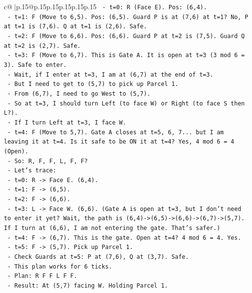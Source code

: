 \documentclass{article}
\begin{document}
{\begin{supertabular}{c@{$\;$}|p{.15\linewidth}@{}p{.15\linewidth}p{.15\linewidth}p{.15\linewidth}p{.15\linewidth}p{.15\linewidth}}
{{{\texttt{    {-} t=0: R (Face E). Pos: (6,4).} \\
\texttt{    {-} t=1: F (Move to 6,5). Pos: (6,5). Guard P is at (7,6) at t=1? No, P at t=1 is (7,6). Q at t=1 is (2,6). Safe.} \\
\texttt{    {-} t=2: F (Move to 6,6). Pos: (6,6). Guard P at t=2 is (7,5). Guard Q at t=2 is (2,7). Safe.} \\
\texttt{    {-} t=3: F (Move to 6,7). This is Gate A. It is open at t=3 (3 mod 6 = 3). Safe to enter.} \\
\texttt{      {-} Wait, if I enter at t=3, I am at (6,7) at the end of t=3.} \\
\texttt{      {-} But I need to get to (5,7) to pick up Parcel 1.} \\
\texttt{      {-} From (6,7), I need to go West to (5,7).} \\
\texttt{      {-} So at t=3, I should turn Left (to face W) or Right (to face S then L?).} \\
\texttt{      {-} If I turn Left at t=3, I face W.} \\
\texttt{      {-} t=4: F (Move to 5,7). Gate A closes at t=5, 6, 7... but I am leaving it at t=4. Is it safe to be ON it at t=4? Yes, 4 mod 6 = 4 (Open).} \\
\texttt{      {-} So: R, F, F, L, F, F?} \\
\texttt{      {-} Let's trace:} \\
\texttt{        {-} t=0: R {-}> Face E. (6,4).} \\
\texttt{        {-} t=1: F {-}> (6,5).} \\
\texttt{        {-} t=2: F {-}> (6,6).} \\
\texttt{        {-} t=3: L {-}> Face W. (6,6). (Gate A is open at t=3, but I don't need to enter it yet? Wait, the path is (6,4){-}>(6,5){-}>(6,6){-}>(6,7){-}>(5,7). If I turn at (6,6), I am not entering the gate. That's safer.)} \\
\texttt{        {-} t=4: F {-}> (6,7). This is the gate. Open at t=4? 4 mod 6 = 4. Yes.} \\
\texttt{        {-} t=5: F {-}> (5,7). Pick up Parcel 1.} \\
\texttt{        {-} Check Guards at t=5: P at (7,6), Q at (3,7). Safe.} \\
\texttt{      {-} This plan works for 6 ticks.} \\
\texttt{      {-} Plan: R F F L F F.} \\
\texttt{      {-} Result: At (5,7) facing W. Holding Parcel 1.} \\
}}}
\end{supertabular}}
\end{document}
